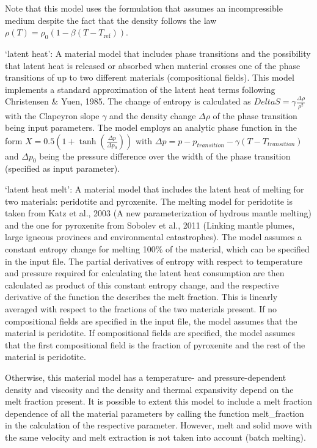 \begin{itemize}
Note that this model uses the formulation that assumes an incompressible medium despite the fact that the density follows the law $\rho(T)=\rho_0(1-\beta(T-T_{\text{ref}}))$. 

`latent heat': A material model that includes phase transitions and the possibility that latent heat is released or absorbed when material crosses one of the phase transitions of up to two different materials (compositional fields). This model implements a standard approximation of the latent heat terms following Christensen \& Yuen, 1985. The change of entropy is calculated as $Delta S = \gamma \frac{\Delta\rho}{\rho^2}$ with the Clapeyron slope $\gamma$ and the density change $\Delta\rho$ of the phase transition being input parameters. The model employs an analytic phase function in the form $X=0.5 \left( 1 + \tanh \left( \frac{\Delta p}{\Delta p_0} \right) \right)$ with $\Delta p = p - p_{transition} - \gamma \left( T - T_{transition} \right)$ and $\Delta p_0$ being the pressure difference over the width of the phase transition (specified as input parameter).

`latent heat melt': A material model that includes the latent heat of melting for two materials: peridotite and pyroxenite. The melting model for peridotite is taken from Katz et al., 2003 (A new parameterization of hydrous mantle melting) and the one for pyroxenite from Sobolev et al., 2011 (Linking mantle plumes, large igneous provinces and environmental catastrophes). The model assumes a constant entropy change for melting 100\% of the material, which can be specified in the input file. The partial derivatives of entropy with respect to temperature and pressure required for calculating the latent heat consumption are then calculated as product of this constant entropy change, and the respective derivative of the function the describes the melt fraction. This is linearly averaged with respect to the fractions of the two materials present. If no compositional fields are specified in the input file, the model assumes that the material is peridotite. If compositional fields are specified, the model assumes that the first compositional field is the fraction of pyroxenite and the rest of the material is peridotite. 

Otherwise, this material model has a temperature- and pressure-dependent density and viscosity and the density and thermal expansivity depend on the melt fraction present. It is possible to extent this model to include a melt fraction dependence of all the material parameters by calling the function melt_fraction in the calculation of the respective parameter. However, melt and solid move with the same velocity and melt extraction is not taken into account (batch melting). 


\end{itemize}
